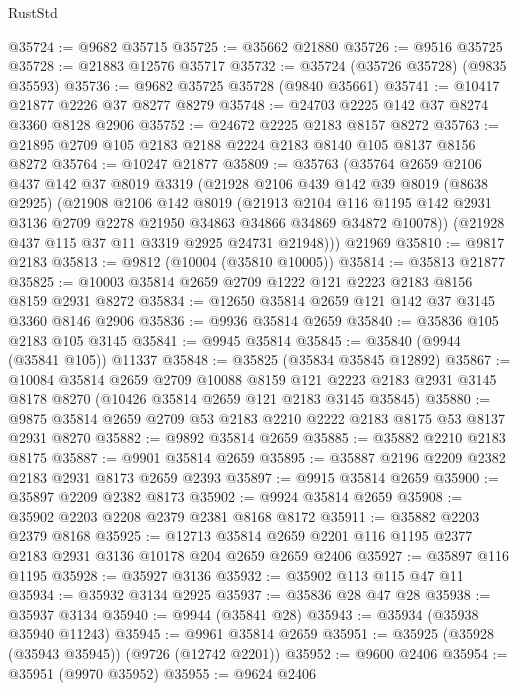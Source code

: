\begin{lexlean}{RustStd}
\begin{coremodule}
@35724 := @9682 @35715
@35725 := @35662 @21880
@35726 := @9516 @35725
@35728 := @21883 @12576 @35717
@35732 := @35724 (@35726 @35728) (@9835 @35593)
@35736 := @9682 @35725 @35728 (@9840 @35661)
@35741 := @10417 @21877 @2226 @37 @8277 @8279
@35748 := @24703 @2225 @142 @37 @8274 @3360 @8128 @2906
@35752 := @24672 @2225 @2183 @8157 @8272
@35763 := @21895 @2709 @105 @2183 @2188 @2224 @2183 @8140 @105 @8137 @8156 @8272
@35764 := @10247 @21877
@35809 := @35763
    (@35764
      @2659
      @2106
      @437
      @142
      @37
      @8019
      @3319
      (@21928
        @2106
        @439
        @142
        @39
        @8019
        (@8638 @2925)
        (@21908
          @2106
          @142
          @8019
          (@21913
            @2104
            @116
            @1195
            @142
            @2931
            @3136
            @2709
            @2278
            @21950
            @34863
            @34866
            @34869
            @34872
            @10078))
        (@21928 @437 @115 @37 @11 @3319 @2925 @24731 @21948)))
    @21969
@35810 := @9817 @2183
@35813 := @9812 (@10004 (@35810 @10005))
@35814 := @35813 @21877
@35825 := @10003 @35814 @2659 @2709 @1222 @121 @2223 @2183 @8156 @8159 @2931 @8272
@35834 := @12650 @35814 @2659 @121 @142 @37 @3145 @3360 @8146 @2906
@35836 := @9936 @35814 @2659
@35840 := @35836 @105 @2183 @105 @3145
@35841 := @9945 @35814
@35845 := @35840 (@9944 (@35841 @105)) @11337
@35848 := @35825 (@35834 @35845 @12892)
@35867 := @10084
    @35814
    @2659
    @2709
    @10088
    @8159
    @121
    @2223
    @2183
    @2931
    @3145
    @8178
    @8270
    (@10426 @35814 @2659 @121 @2183 @3145 @35845)
@35880 := @9875 @35814 @2659 @2709 @53 @2183 @2210 @2222 @2183 @8175 @53 @8137 @2931 @8270
@35882 := @9892 @35814 @2659
@35885 := @35882 @2210 @2183 @8175
@35887 := @9901 @35814 @2659
@35895 := @35887 @2196 @2209 @2382 @2183 @2931 @8173 @2659 @2393
@35897 := @9915 @35814 @2659
@35900 := @35897 @2209 @2382 @8173
@35902 := @9924 @35814 @2659
@35908 := @35902 @2203 @2208 @2379 @2381 @8168 @8172
@35911 := @35882 @2203 @2379 @8168
@35925 := @12713 @35814 @2659 @2201 @116 @1195 @2377 @2183 @2931 @3136 @10178 @204 @2659 @2659 @2406
@35927 := @35897 @116 @1195
@35928 := @35927 @3136
@35932 := @35902 @113 @115 @47 @11
@35934 := @35932 @3134 @2925
@35937 := @35836 @28 @47 @28
@35938 := @35937 @3134
@35940 := @9944 (@35841 @28)
@35943 := @35934 (@35938 @35940 @11243)
@35945 := @9961 @35814 @2659
@35951 := @35925 (@35928 (@35943 @35945)) (@9726 (@12742 @2201))
@35952 := @9600 @2406
@35954 := @35951 (@9970 @35952)
@35955 := @9624 @2406

\end{coremodule}
\end{lexlean}
